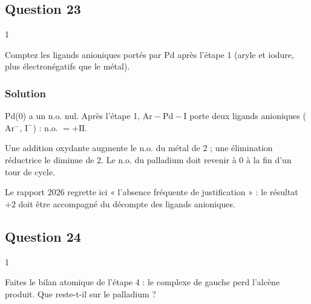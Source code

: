 \documentclass[11pt,a4paper]{article}
\newcommand{\equationajustee}[1]{%
  \sbox{\boiteequation}{$\displaystyle #1$}%
  \ifdim\wd\boiteequation>\linewidth
    \[\resizebox{\linewidth}{!}{\usebox{\boiteequation}}\]%
  \else
    \[#1\]%
  \fi}
\begin{document}
\hypertarget{question-23}{%
\subsection{Question 23}\label{question-23}}

\begin{indication}{1}

Comptez les ligands anioniques portés par Pd après l'étape 1 (aryle et iodure, plus électronégatifs que le métal).

\end{indication}

\hypertarget{solution-22}{%
\subsubsection{Solution}\label{solution-22}}

Pd(0) a un n.o. nul. Après l'étape 1, \(\mathrm{Ar{-}Pd{-}I}\) porte deux ligands anioniques (\(\mathrm{Ar^-}\), \(\mathrm{I^-}\)) : n.o. \(=+\mathrm{II}\).

\equationajustee{\boxed{\Delta\,\text{n.o.(Pd)}=+2}}

\begin{methode}

Une addition oxydante augmente le n.o. du métal de 2 ; une élimination réductrice le diminue de 2. Le n.o. du palladium doit revenir à 0 à la fin d'un tour de cycle.

\end{methode}

\begin{jury}

Le rapport 2026 regrette ici « l'absence fréquente de justification » : le résultat \(+2\) doit être accompagné du décompte des ligands anioniques.

\end{jury}

\hypertarget{question-24}{%
\subsection{Question 24}\label{question-24}}

\begin{indication}{1}

Faites le bilan atomique de l'étape 4 : le complexe de gauche perd l'alcène produit. Que reste-t-il sur le palladium ?

\end{indication}
\end{document}
